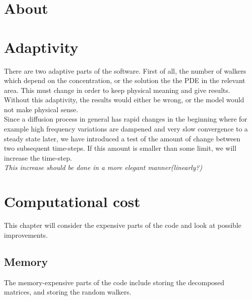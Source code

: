 \section{About}

\section{Adaptivity}
There are two adaptive parts of the software. First of all, the number of walkers which depend on the concentration, or the solution the the PDE in the relevant area. This must change in order to keep physical meaning and give results. Without this adaptivity, the results would either be wrong, or the model would not make physical sense.\\
Since a diffusion process in general has rapid changes in the beginning where for example high frequency variations are dampened and very slow convergence to a steady state later, we have introduced a test of the amount of change between two subsequent time-steps. If this amount is smaller than some limit, we will increase the time-step.\\
\emph{This increase should be done in a more elegant manner(linearly?)}

\section{Computational cost}
This chapter will consider the expensive parts of the code and look at possible improvements.

\subsection{Memory}
The memory-expensive parts of the code include storing the decomposed matrices, and storing the random walkers.

